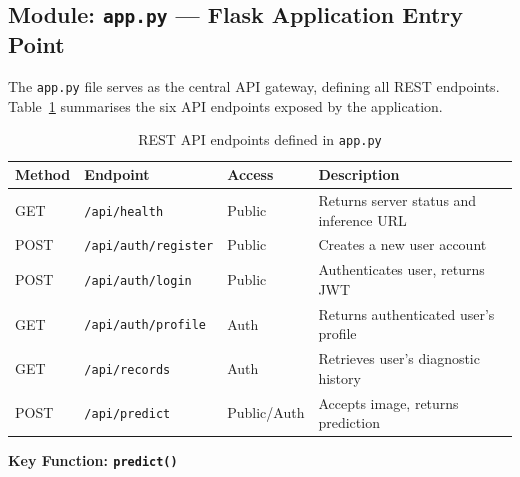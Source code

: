 \documentclass[12pt, a4paper, oneside]{report}
\begin{document}
\subsection{Module: \texttt{app.py} --- Flask Application Entry Point}
\label{subsec:app_py}

The \texttt{app.py} file serves as the central API gateway, defining all REST endpoints. Table~\ref{tab:app_endpoints} summarises the six API endpoints exposed by the application.

\begin{table}[H]
\centering
\caption{REST API endpoints defined in \texttt{app.py}}
\label{tab:app_endpoints}
\begin{tabularx}{\textwidth}{lllX}
\toprule
\textbf{Method} & \textbf{Endpoint} & \textbf{Access} & \textbf{Description} \\
\midrule
GET & \texttt{/api/health} & Public & Returns server status and inference URL \\
POST & \texttt{/api/auth/register} & Public & Creates a new user account \\
POST & \texttt{/api/auth/login} & Public & Authenticates user, returns JWT \\
GET & \texttt{/api/auth/profile} & Auth & Returns authenticated user's profile \\
GET & \texttt{/api/records} & Auth & Retrieves user's diagnostic history \\
POST & \texttt{/api/predict} & Public/Auth & Accepts image, returns prediction \\
\bottomrule
\end{tabularx}
\end{table}

\textbf{Key Function: \texttt{predict()}}
\end{document}
